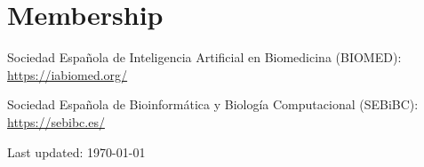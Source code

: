 \documentclass[11pt,fullpage]{article}
\renewenvironment{itemize}{
  \begin{list}{}{
    \setlength{\leftmargin}{1.5em}
  }
}{
  \end{list}
}
\begin{document}
\section*{Membership}

\begin{itemize}
  \item Sociedad Española de Inteligencia Artificial en Biomedicina (BIOMED): \href{https://iabiomed.org/}{https://iabiomed.org/}
  \item Sociedad Española de Bioinformática y Biología Computacional (SEBiBC): \href{https://sebibc.es/}{https://sebibc.es/}
\end{itemize}

\bigskip
\begin{center}
  \begin{footnotesize}
    Last updated: \today
  \end{footnotesize}
\end{center}

\end{document}
